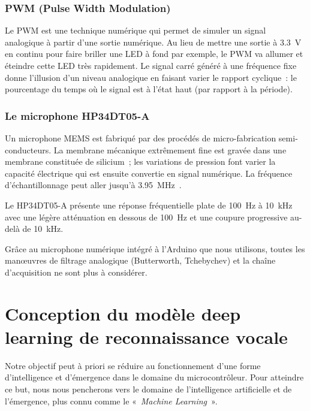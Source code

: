 \documentclass[a4paper,12pt,twoside]{report}
\theoremstyle{definition}
\theoremstyle{plain}
\theoremstyle{remark}
\begin{document}
\subsection*{PWM (Pulse Width Modulation)}

Le \ac{PWM} est une technique numérique qui permet de simuler un signal analogique à partir
d'une sortie numérique. Au lieu de mettre une sortie à \SI{3.3}{V} en continu pour faire
briller une LED à fond par exemple, le \ac{PWM} va allumer et éteindre cette LED très
rapidement. Le signal carré généré à une fréquence fixe donne l'illusion d'un niveau
analogique en faisant varier le rapport cyclique~: le pourcentage du temps où le signal est
à l'état haut (par rapport à la période).

\subsection*{Le microphone HP34DT05-A}
\label{subsec:microphone}

Un microphone \ac{MEMS} est fabriqué par des procédés de micro-fabrication semi-conducteurs.
La membrane mécanique extrêmement fine est gravée dans une membrane constituée de silicium~;
les variations de pression font varier la capacité électrique qui est ensuite convertie en
signal numérique. La fréquence d'échantillonnage peut aller jusqu'à \SI{3.95}{MHz}~\cite{hp34dtos}.

Le HP34DT05-A présente une réponse fréquentielle plate de \SI{100}{Hz} à \SI{10}{kHz} avec
une légère atténuation en dessous de \SI{100}{Hz} et une coupure progressive au-delà de
\SI{10}{kHz}.

Grâce au microphone numérique intégré à l'Arduino que nous utilisons, toutes les manœuvres
de filtrage analogique (Butterworth, Tchebychev) et la chaîne d'acquisition ne sont plus à
considérer.

\chapter{Conception du modèle deep learning de reconnaissance vocale}
\label{chap:deeplearning}

Notre objectif peut à priori se réduire au fonctionnement d'une forme d'intelligence et
d'émergence dans le domaine du microcontrôleur. Pour atteindre ce but, nous nous pencherons
vers le domaine de l'intelligence artificielle et de l'émergence, plus connu comme le
«~\textit{Machine Learning}~».
\end{document}
